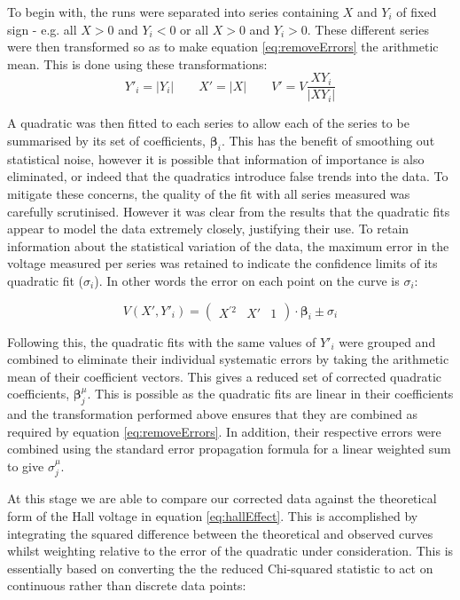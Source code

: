 \documentclass{article}
\begin{document}
		To begin with, the runs were separated into series containing $X$ and $Y_i$ of fixed sign - e.g. all $X>0$ and $Y_i<0$ or all $X>0$ and $Y_i>0$. These different series were then transformed so as to make equation \ref{eq:removeErrors} the arithmetic mean. This is done using these transformations:
		\[Y'_i = |Y_i| \qquad X' = |X| \qquad V' = V\frac{XY_i}{|XY_i|}\]
		
		A quadratic was then fitted to each series to allow each of the series to be summarised by its set of coefficients, $\boldsymbol{\beta}_i$. This has the benefit of smoothing out statistical noise, however it is possible that information of importance is also eliminated, or indeed that the quadratics introduce false trends into the data. To mitigate these concerns, the quality of the fit with all series measured was carefully scrutinised. However it was clear from the results that the quadratic fits appear to model the data extremely closely, justifying their use. To retain information about the statistical variation of the data, the maximum error in the voltage measured per series was retained to indicate the confidence limits of its quadratic fit ($\sigma_i$). In other words the error on each point on the curve is $\sigma_i$:
		
		\begin{equation}
			V(X',Y'_i) = \begin{pmatrix}X^{\prime2} & X' & 1\end{pmatrix}\cdot\boldsymbol{\beta}_i \pm \sigma_i
		\end{equation}
		
		Following this, the quadratic fits with the same values of $Y'_i$ were grouped and combined to eliminate their individual systematic errors by taking the arithmetic mean of their coefficient vectors. This gives a reduced set of corrected quadratic coefficients, $\boldsymbol{\beta}^\mu_j$. This is possible as the quadratic fits are linear in their coefficients and the transformation performed above ensures that they are combined as required by equation \ref{eq:removeErrors}. In addition, their respective errors were combined using the standard error propagation formula for a linear weighted sum to give $\sigma^\mu_j$.
		
		At this stage we are able to compare our corrected data against the theoretical form of the Hall voltage in equation \ref{eq:hallEffect}. This is accomplished by integrating the squared difference between the theoretical and observed curves whilst weighting relative to the error of the quadratic under consideration. This is essentially based on converting the the reduced Chi-squared statistic to act on continuous rather than discrete data points:
		
\end{document}
